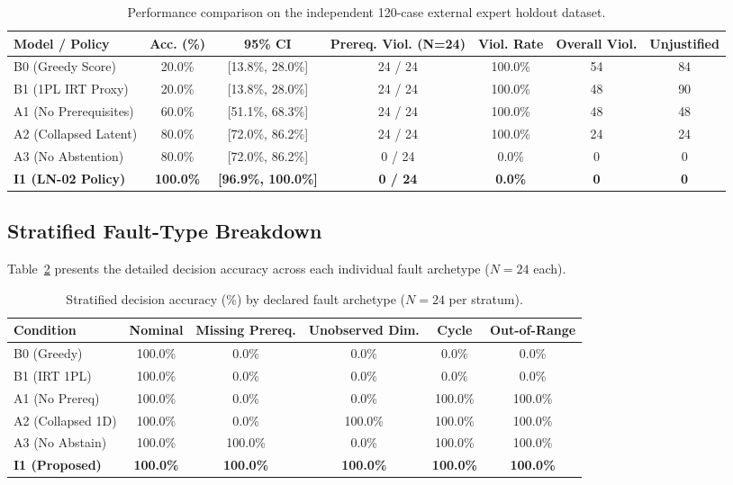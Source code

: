 \documentclass[11pt,a4paper]{article}
\begin{document}
\begin{table}[htbp]
\centering
\small
\caption{Performance comparison on the independent 120-case external expert holdout dataset.}
\label{tab:holdout-main}
\begin{tabular}{lcccccc}
\toprule
\textbf{Model / Policy} & \textbf{Acc. (\%)} & \textbf{95\% CI} & \textbf{Prereq. Viol. (N=24)} & \textbf{Viol. Rate} & \textbf{Overall Viol.} & \textbf{Unjustified} \\
\midrule
B0 (Greedy Score)       & 20.0\% & [13.8\%, 28.0\%] & 24 / 24 & 100.0\% & 54 & 84 \\
B1 (1PL IRT Proxy)      & 20.0\% & [13.8\%, 28.0\%] & 24 / 24 & 100.0\% & 48 & 90 \\
A1 (No Prerequisites)   & 60.0\% & [51.1\%, 68.3\%] & 24 / 24 & 100.0\% & 48 & 48 \\
A2 (Collapsed Latent)   & 80.0\% & [72.0\%, 86.2\%] & 24 / 24 & 100.0\% & 24 & 24 \\
A3 (No Abstention)      & 80.0\% & [72.0\%, 86.2\%] &  0 / 24 &   0.0\% &  0 &  0 \\
\midrule
\textbf{I1 (LN-02 Policy)} & \textbf{100.0\%} & \textbf{[96.9\%, 100.0\%]} & \textbf{0 / 24} & \textbf{0.0\%} & \textbf{0} & \textbf{0} \\
\bottomrule
\end{tabular}
\end{table}

\subsection{Stratified Fault-Type Breakdown}

Table~\ref{tab:fault-breakdown} presents the detailed decision accuracy across each individual fault archetype ($N=24$ each).

\begin{table}[htbp]
\centering
\small
\caption{Stratified decision accuracy (\%) by declared fault archetype ($N=24$ per stratum).}
\label{tab:fault-breakdown}
\begin{tabular}{lccccc}
\toprule
\textbf{Condition} & \textbf{Nominal} & \textbf{Missing Prereq.} & \textbf{Unobserved Dim.} & \textbf{Cycle} & \textbf{Out-of-Range} \\
\midrule
B0 (Greedy)        & 100.0\% &   0.0\% &   0.0\% &   0.0\% &   0.0\% \\
B1 (IRT 1PL)       & 100.0\% &   0.0\% &   0.0\% &   0.0\% &   0.0\% \\
A1 (No Prereq)     & 100.0\% &   0.0\% &   0.0\% & 100.0\% & 100.0\% \\
A2 (Collapsed 1D)  & 100.0\% &   0.0\% & 100.0\% & 100.0\% & 100.0\% \\
A3 (No Abstain)    & 100.0\% & 100.0\% &   0.0\% & 100.0\% & 100.0\% \\
\midrule
\textbf{I1 (Proposed)} & \textbf{100.0\%} & \textbf{100.0\%} & \textbf{100.0\%} & \textbf{100.0\%} & \textbf{100.0\%} \\
\bottomrule
\end{tabular}
\end{table}
\end{document}
